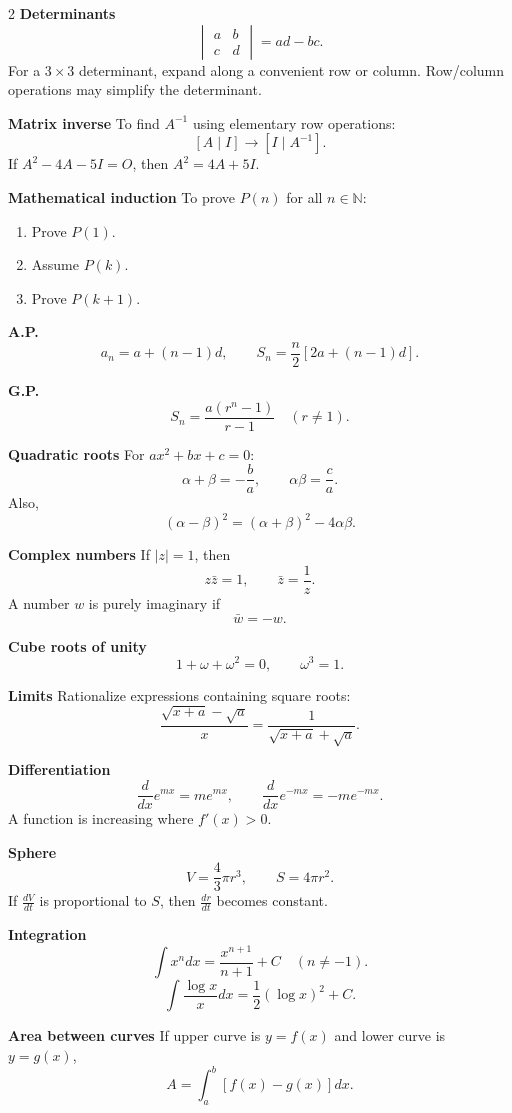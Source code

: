 \documentclass[11pt,a4paper]{article}
\begin{document}
\begin{tcolorbox}[breakable,colback=blue!3,colframe=blue!40,title=\textbf{Important theory, formulas and methods}]
\begin{multicols}{2}
\textbf{Determinants}
\[
\begin{vmatrix}a&b\\c&d\end{vmatrix}=ad-bc.
\]
For a $3\times3$ determinant, expand along a convenient row or column. Row/column operations may simplify the determinant.

\textbf{Matrix inverse}
To find $A^{-1}$ using elementary row operations:
\[
[A\mid I]\to[I\mid A^{-1}].
\]
If $A^2-4A-5I=O$, then $A^2=4A+5I$.

\textbf{Mathematical induction}
To prove $P(n)$ for all $n\in\mathbb N$:
\begin{enumerate}
\item Prove $P(1)$.
\item Assume $P(k)$.
\item Prove $P(k+1)$.
\end{enumerate}

\textbf{A.P.}
\[
a_n=a+(n-1)d,
\qquad S_n=\frac n2[2a+(n-1)d].
\]

\textbf{G.P.}
\[
S_n=\frac{a(r^n-1)}{r-1}\quad(r\ne1).
\]

\textbf{Quadratic roots}
For $ax^2+bx+c=0$:
\[
\alpha+\beta=-\frac ba,
\qquad \alpha\beta=\frac ca.
\]
Also,
\[
(\alpha-\beta)^2=(\alpha+\beta)^2-4\alpha\beta.
\]

\textbf{Complex numbers}
If $|z|=1$, then
\[
z\bar z=1,
\qquad \bar z=\frac1z.
\]
A number $w$ is purely imaginary if
\[
\bar w=-w.
\]

\textbf{Cube roots of unity}
\[
1+\omega+\omega^2=0,
\qquad \omega^3=1.
\]

\textbf{Limits}
Rationalize expressions containing square roots:
\[
\frac{\sqrt{x+a}-\sqrt a}{x}
=\frac{1}{\sqrt{x+a}+\sqrt a}.
\]

\textbf{Differentiation}
\[
\frac{d}{dx}e^{mx}=me^{mx},
\qquad
\frac{d}{dx}e^{-mx}=-me^{-mx}.
\]
A function is increasing where $f'(x)>0$.

\textbf{Sphere}
\[
V=\frac43\pi r^3,
\qquad S=4\pi r^2.
\]
If $\frac{dV}{dt}$ is proportional to $S$, then $\frac{dr}{dt}$ becomes constant.

\textbf{Integration}
\[
\int x^n dx=\frac{x^{n+1}}{n+1}+C\quad(n\ne -1).
\]
\[
\int \frac{\log x}{x}dx=\frac12(\log x)^2+C.
\]

\textbf{Area between curves}
If upper curve is $y=f(x)$ and lower curve is $y=g(x)$,
\[
A=\int_a^b[f(x)-g(x)]dx.
\]


\end{multicols}
\end{tcolorbox}
\end{document}
